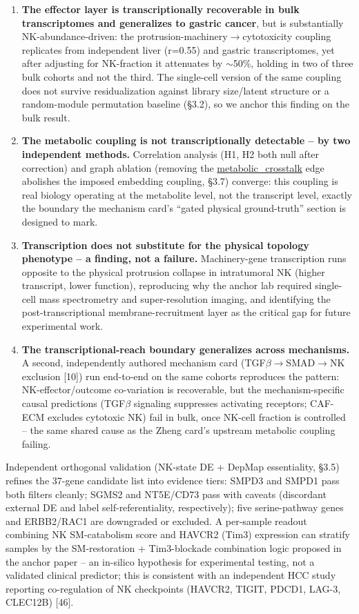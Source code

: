 \documentclass[modern,large,numbered,nocrop]{oup-authoring-template}
\begin{document}
\begin{enumerate}
\item \textbf{The effector layer is transcriptionally recoverable in bulk transcriptomes and generalizes to gastric cancer}, but is substantially NK-abundance-driven: the protrusion-machinery$\to$cytotoxicity coupling replicates from independent liver (r=0.55) and gastric transcriptomes, yet after adjusting for NK-fraction it attenuates by $\sim$50\%, holding in two of three bulk cohorts and not the third. The single-cell version of the same coupling does not survive residualization against library size/latent structure or a random-module permutation baseline (\S{}3.2), so we anchor this finding on the bulk result.
\item \textbf{The metabolic coupling is not transcriptionally detectable -- by two independent methods.} Correlation analysis (H1, H2 both null after correction) and graph ablation (removing the \url{metabolic_crosstalk} edge abolishes the imposed embedding coupling, \S{}3.7) converge: this coupling is real biology operating at the metabolite level, not the transcript level, exactly the boundary the mechanism card's ``gated physical ground-truth'' section is designed to mark.
\item \textbf{Transcription does not substitute for the physical topology phenotype -- a finding, not a failure.} Machinery-gene transcription runs opposite to the physical protrusion collapse in intratumoral NK (higher transcript, lower function), reproducing why the anchor lab required single-cell mass spectrometry and super-resolution imaging, and identifying the post-transcriptional membrane-recruitment layer as the critical gap for future experimental work.
\item \textbf{The transcriptional-reach boundary generalizes across mechanisms.} A second, independently authored mechanism card (TGF$\beta$$\to$SMAD$\to$NK exclusion [10]) run end-to-end on the same cohorts reproduces the pattern: NK-effector/outcome co-variation is recoverable, but the mechanism-specific causal predictions (TGF$\beta$ signaling suppresses activating receptors; CAF-ECM excludes cytotoxic NK) fail in bulk, once NK-cell fraction is controlled -- the same shared cause as the Zheng card's upstream metabolic coupling failing.
\end{enumerate}

Independent orthogonal validation (NK-state DE + DepMap essentiality, \S{}3.5) refines the 37-gene candidate list into evidence tiers: SMPD3 and SMPD1 pass both filters cleanly; SGMS2 and NT5E/CD73 pass with caveats (discordant external DE and label self-referentiality, respectively); five serine-pathway genes and ERBB2/RAC1 are downgraded or excluded. A per-sample readout combining NK SM-catabolism score and HAVCR2 (Tim3) expression can stratify samples by the SM-restoration + Tim3-blockade combination logic proposed in the anchor paper -- an in-silico hypothesis for experimental testing, not a validated clinical predictor; this is consistent with an independent HCC study reporting co-regulation of NK checkpoints (HAVCR2, TIGIT, PDCD1, LAG-3, CLEC12B) [46].
\end{document}
